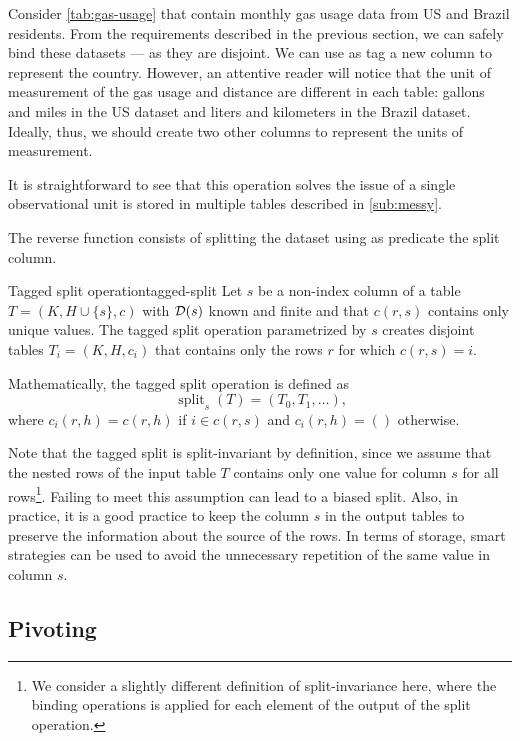 Consider \cref{tab:gas-usage} that contain monthly gas usage data from
US and Brazil residents.  From the requirements described in the previous section, we can
safely bind these datasets --- as they are disjoint.  We can use as tag a new column to
represent the country.  However, an attentive reader will notice that the unit of
measurement of the gas usage and distance are different in each table: gallons and miles
in the US dataset and liters and kilometers in the Brazil dataset.  Ideally, thus, we
should create two other columns to represent the units of measurement.

It is straightforward to see that this operation solves the issue of a single
observational unit is stored in multiple tables described in \cref{sub:messy}.

The reverse function consists of splitting the dataset using as predicate the split column.

\begin{defbox}{Tagged split operation}{tagged-split}
  Let $s$ be a non-index column of a table $T = (K, H \cup \{s\}, c)$ with $\mathcal{D}\!\left(s\right)$
  known and finite and that $c(r, s)$ contains only unique values. The tagged split
  operation parametrized by $s$ creates disjoint tables $T_i = (K, H, c_i)$ that contains
  only the rows $r$ for which $c(r, s) = i$.

  Mathematically, the tagged split operation is defined as \[
    \operatorname{split}_{s}(T) = \left(T_0, T_1, \dots\right)\text{,}
  \] where $c_i(r, h) = c(r, h)$ if $i \in c(r, s)$ and $c_i(r, h) = ()$ otherwise.
\end{defbox}

Note that the tagged split is split-invariant by definition, since we assume that the
nested rows of the input table $T$ contains only one value for column $s$ for all
rows\footnote{We consider a slightly different definition of split-invariance here, where
the binding operations is applied for each element of the output of the split operation.}.
Failing to meet this assumption can lead to a biased split.  Also, in practice, it is a
good practice to keep the column $s$ in the output tables to preserve the information
about the source of the rows.  In terms of storage, smart strategies can be used to
avoid the unnecessary repetition of the same value in column $s$.

\subsection{Pivoting}

